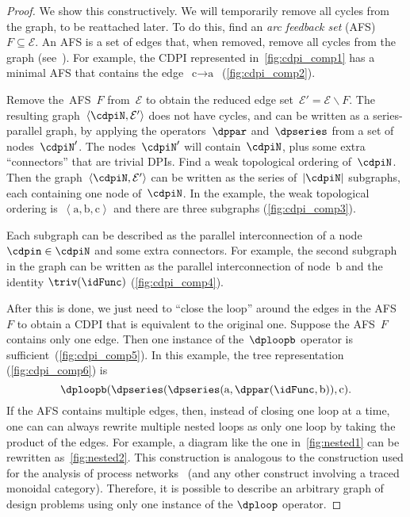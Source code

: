 \begin{proof}
  We show this constructively. We will temporarily remove all cycles
  from the graph, to be reattached later. To do this, find an \emph{arc
  feedback set} (AFS) $F\subseteq\mathcal{E}$. An AFS is a set of edges
  that, when removed, remove all cycles from the graph (see~\cite{golovach15incremental}).
  For example, the CDPI represented in~\cref{fig:cdpi_comp1} has a minimal
  AFS that contains the edge~$\text{c}\rightarrow\text{a}$~(\cref{fig:cdpi_comp2}).


  Remove the~AFS~$F$ from~$\mathcal{E}$ to obtain the reduced edge
  set~$\mathcal{E}'=\mathcal{E}\backslash F$. The resulting graph~$\left\langle \cdpiN,\mathcal{E}'\right\rangle $
  does not have cycles, and can be written as a series-parallel graph,
  by applying the operators~$\dppar$ and~$\dpseries$ from a set
  of nodes~$\cdpiN'$. The nodes~$\cdpiN'$ will contain~$\cdpiN$,
  plus some extra ``connectors'' that are trivial DPIs. Find a weak
  topological ordering of~$\cdpiN$. Then the graph~$\left\langle \cdpiN,\mathcal{E}'\right\rangle $
  can be written as the series of~$|\cdpiN|$ subgraphs, each containing
  one node of~$\cdpiN$. In the example, the weak topological ordering
  is~$\left\langle \text{a},\text{b},\text{c}\right\rangle $ and there
  are three subgraphs (\cref{fig:cdpi_comp3}).


  \noindent Each subgraph can be described as the parallel interconnection
  of a node~$\cdpin\in\cdpiN$ and some extra connectors. For example,
  the second subgraph in the graph can be written as the parallel interconnection
  of node~$\text{b}$ and the identity $\triv(\idFunc)$ (\cref{fig:cdpi_comp4}).


  After this is done, we just need to ``close the loop'' around the
  edges in the AFS~$F$ to obtain a CDPI that is equivalent to the
  original one. Suppose the AFS~$F$ contains only one edge. Then one
  instance of the~$\dploopb$ operator is sufficient~(\cref{fig:cdpi_comp5}).
  In this example, the tree representation (\cref{fig:cdpi_comp6}) is
  \[
    \dploopb(\dpseries(\dpseries(\text{a},\dppar(\idFunc,\text{b})),\text{c}).
  \]
  If the AFS contains multiple edges, then, instead of closing one loop
  at a time, one can can always rewrite multiple nested loops as only
  one loop by taking the product of the edges. For example, a diagram
  like the one in~\cref{fig:nested1} can be rewritten as~\cref{fig:nested2}.
  This construction is analogous to the construction used for the analysis
  of process networks~\cite{lee10} (and any other construct involving
  a traced monoidal category). Therefore, it is possible to describe
  an arbitrary graph of design problems using only one instance of the
  $\dploop$ operator.
\end{proof}

